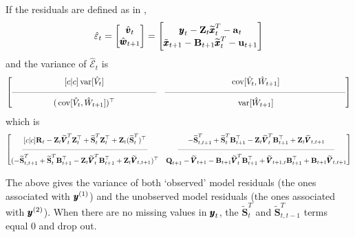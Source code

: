 \documentclass[]{article}
\def\UPS{\mbox{\boldmath $\Upsilon$}}
\def\XI{\mbox{\boldmath $\Xi$}}
\def\BB{\mbox{$\mathbf B$}}	\def\bb{\mbox{$\mathbf b$}} \def\Bb{\mbox{$\mathbf J$}} \def\Ba{\mbox{$\mathbf L$}} \def\Bm{\UPS}
\def\QQ{\mbox{$\mathbf Q$}}	 \def\qq{\mbox{$\mathbf q$}} \def\Qb{\mbox{$\mathbf G$}}  \def\Qm{\mathbb{Q}}
\def\RR{\mbox{$\mathbf R$}}	 \def\rr{\mbox{$\mathbf r$}} \def\Rb{\mbox{$\mathbf H$}}	\def\Rm{\mathbb{R}}
\def\Ss{\mbox{$\mathbf S$}}
\def\VV{\mbox{$\pmb{V}$}}	\def\vv{\mbox{$\pmb{v}$}}
\def\ZZ{\mbox{$\mathbf Z$}}	\def\zz{\mbox{$\mathbf z$}}	\def\Zb{\mbox{$\mathbf M$}} \def\Za{\mbox{$\mathbf N$}} \def\Zm{\XI}
\def\var{\,\textup{\textrm{var}}}
\def\cov{\,\textup{\textrm{cov}}}
\def\hatxt{\widetilde{\xx}_t^T}
\def\hatVt{\widetilde{\VV}_t^T}
\def\hatSt{\widetilde{\Ss}_t^T}
\def\hatSttm{\widetilde{\Ss}_{t,t-1}^T}
\def\hatSttp{\widetilde{\Ss}_{t,t+1}^T}
\begin{document}
If the residuals are defined as in \citet{Harveyetal1998},
\begin{equation}
\hat{\varepsilon}_t = \begin{bmatrix}\hat{\vv}_t\\ \hat{\ww}_{t+1}\end{bmatrix} =
\begin{bmatrix}\yy_t - \ZZ_t\hatxt-\aa_t\\ \tilde{\xx}_{t+1} - \BB_{t+1}\hatxt-\uu_{t+1} \end{bmatrix}
\end{equation}
and the variance of $\hat{\mathcal{E}}_t$ is
\begin{equation}
 \begin{bmatrix}[c|c]
 \var[\hat{V}_t]&
 \cov[\hat{V}_t, \hat{W}_{t+1}] \\
 \rule[.5ex]{40ex}{0.25pt} & \rule[.5ex]{50ex}{0.25pt} \\
 (\cov[\hat{V}_t, \hat{W}_{t+1}])^\top& 
 \var[\hat{W}_{t+1}] \end{bmatrix}
\end{equation}
which is
\begin{equation}\label{eqn:jointcondresid2}
\begin{bmatrix}[c|c]
\RR_t - \ZZ_t \hatVt \ZZ_t^\top + \hatSt\ZZ_t^\top + \ZZ_t(\hatSt)^\top&
- \hatSttp + \hatSt\BB_{t+1}^\top - \ZZ_t\hatVt\BB_{t+1}^\top + \ZZ_t\widetilde{\VV}_{t,t+1} \\
\rule[.5ex]{40ex}{0.25pt} & \rule[.5ex]{50ex}{0.25pt} \\
(- \hatSttp + \hatSt\BB_{t+1}^\top - \ZZ_t\hatVt\BB_{t+1}^\top + \ZZ_t\widetilde{\VV}_{t,t+1})^\top& 
\QQ_{t+1} - \widetilde{\VV}_{t+1} - \BB_{t+1} \hatVt \BB_{t+1}^\top + \widetilde{\VV}_{t+1,t} \BB_{t+1}^\top + \BB_{t+1}\widetilde{\VV}_{t,t+1} \end{bmatrix}
\end{equation}

The above gives the variance of both `observed' model residuals (the ones associated with $\mbox{$\pmb{y}$}^{(1)}$) and the unobserved model residuals (the ones associated with $\mbox{$\pmb{y}$}^{(2)}$).  
When there are no missing values in $\mbox{$\pmb{y}$}_t$, the $\hatSt$ and $\hatSttm$ terms equal 0 and drop out.
\end{document}
